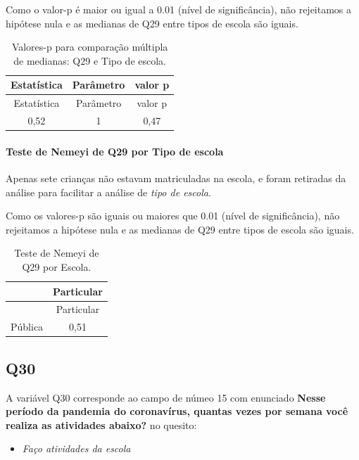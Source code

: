 \documentclass[]{article}
\providecommand{\tightlist}{%
  \setlength{\itemsep}{0pt}\setlength{\parskip}{0pt}}
\let\oldparagraph\paragraph
\renewcommand{\paragraph}[1]{\oldparagraph{#1}\mbox{}}
\begin{document}
Como o valor-p é maior ou igual a 0.01 (nível de significância), não rejeitamos a hipótese nula e as medianas de Q29 entre tipos de escola são iguais.

\begin{longtable}[]{@{}ccc@{}}
\caption{\label{tab:unnamed-chunk-945}Valores-p para comparação múltipla de medianas: Q29 e Tipo de escola.}\tabularnewline
\toprule
Estatística & Parâmetro & valor p\tabularnewline
\midrule
\endfirsthead
\toprule
Estatística & Parâmetro & valor p\tabularnewline
\midrule
\endhead
0,52 & 1 & 0,47\tabularnewline
\bottomrule
\end{longtable}

\hypertarget{teste-de-nemeyi-de-q29-por-tipo-de-escola}{%
\paragraph{Teste de Nemeyi de Q29 por Tipo de escola}\label{teste-de-nemeyi-de-q29-por-tipo-de-escola}}

Apenas sete crianças não estavam matriculadas na escola, e foram retiradas da análise para facilitar a análise de \emph{tipo de escola}.

Como os valores-p são iguais ou maiores que 0.01 (nível de significância), não rejeitamos a hipótese nula e as medianas de Q29 entre tipos de escola são iguais.

\begin{longtable}[]{@{}lc@{}}
\caption{\label{tab:unnamed-chunk-947}Teste de Nemeyi de Q29 por Escola.}\tabularnewline
\toprule
& Particular\tabularnewline
\midrule
\endfirsthead
\toprule
& Particular\tabularnewline
\midrule
\endhead
Pública & 0,51\tabularnewline
\bottomrule
\end{longtable}

\cleardoublepage

\hypertarget{q30}{%
\subsection{Q30}\label{q30}}

A variável Q30 corresponde ao campo de númeo 15 com enunciado \textbf{Nesse período da pandemia do coronavírus, quantas vezes por semana você realiza as atividades abaixo?} no quesito:

\begin{itemize}
\tightlist
\item
  \emph{Faço atividades da escola}
\end{itemize}
\end{document}
